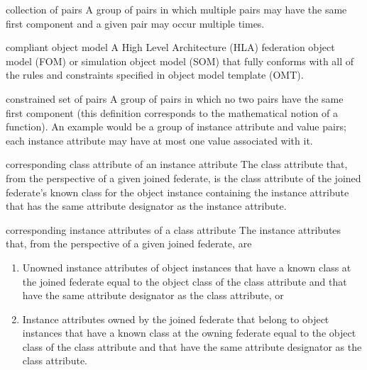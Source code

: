 \begin{definition}{collection of pairs}
    A group of pairs in which multiple pairs may have the same first component and a given pair may occur multiple times.
\end{definition}

\newpage
\begin{definition}{compliant object model}
    A High Level Architecture (HLA) federation object model (FOM) or simulation object model (SOM) that fully conforms with all of the rules and constraints specified in object model template (OMT).
\end{definition}

\begin{definition}{constrained set of pairs}
    A group of pairs in which no two pairs have the same first component (this definition corresponds to the mathematical notion of a function). An example would be a group of instance attribute and value pairs; each instance attribute may have at most one value associated with it.
\end{definition}

\begin{definition}{corresponding class attribute of an instance attribute}
    The class attribute that, from the perspective of a given joined federate, is the class attribute of the joined federate's known class for the object instance containing the instance attribute that has the same attribute designator as the instance attribute.
\end{definition}

\begin{definition}{corresponding instance attributes of a class attribute}
    The instance attributes that, from the perspective of a given joined federate, are
\end{definition}

\begin{enumerate}[label=\alph*)]
\item Unowned instance attributes of object instances that have a known class at the joined federate equal to the object class of the class attribute and that have the same attribute designator as the class attribute, or
\item Instance attributes owned by the joined federate that belong to object instances that have a known class at the owning federate equal to the object class of the class attribute and that have the same attribute designator as the class attribute.
\end{enumerate}

